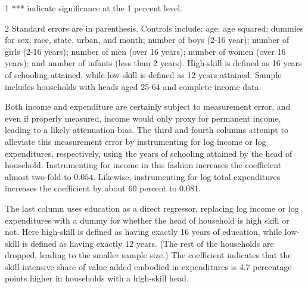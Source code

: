 \documentclass[12pt,english]{article}
\begin{document}
\begin{table}[tbph]
\begin{center}
\begin{threeparttable}
\begin{footnotesize}
\begin{tablenotes}
\item[1] *** indicate significance at the 1 percent level.\\ 
\item[2] Standard errors are in parenthesis. Controls include: age; age squared; dummies for sex, race, state, urban, and
month; number of boys (2-16 year); number of girls (2-16 years); number of
men (over 16 years); number of women (over 16 years); and number of infants
(less than 2 years). High-skill is defined as 16 years of schooling
attained, while low-skill is defined as 12 years attained. Sample includes households with heads aged 25-64 and complete income data.
\end{tablenotes} 
\end{footnotesize} 
\end{threeparttable}
\end{center}
\end{table}

Both income and expenditure are certainly subject to measurement error, and
even if properly measured, income would only proxy for permanent income,
leading to a likely attenuation bias. The third and fourth columns attempt
to alleviate this measurement error by instrumenting for log income or log
expenditures, respectively, using the years of schooling attained by the
head of household. Instrumenting for income in this fashion increases the
coefficient almost two-fold to $0.054$. Likewise, instrumenting for log
total expenditures increases the coefficient by about 60 percent to $0.081$.

The last column uses education as a direct regressor, replacing log income
or log expenditures with a dummy for whether the head of household is high
skill or not. Here high-skill is defined as having exactly 16 years of
education, while low-skill is defined as having exactly 12 years. (The rest
of the households are dropped, leading to the smaller sample size.) The
coefficient indicates that the skill-intensive share of value added embodied
in expenditures is $4.7$ percentage points higher in households with a
high-skill head.
\end{document}
